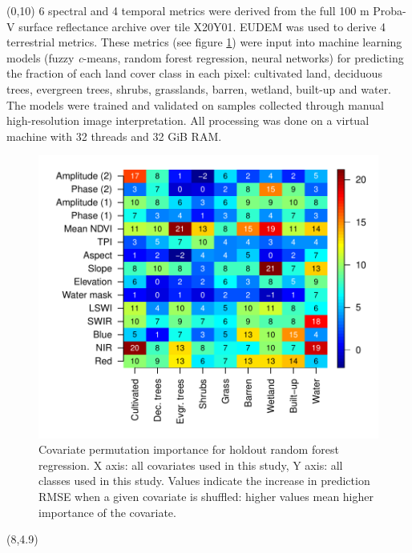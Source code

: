 \documentclass[20pt]{beamer}
\begin{document}
\begin{frame}{}
	\begin{textblock}{7}(0,10)
	  \Line 
	  6 spectral and 4 temporal metrics were derived from the full 100 m Proba-V surface reflectance archive over tile X20Y01. EUDEM was used to derive 4 terrestrial metrics. These metrics (see figure \ref{fig-varimp}) were input into machine learning models (fuzzy \textit{c}-means, random forest regression, neural networks) for predicting the fraction of each land cover class in each pixel: cultivated land, deciduous trees, evergreen trees, shrubs, grasslands, barren, wetland, built-up and water. The models were trained and validated on samples collected through manual high-resolution image interpretation. All processing was done on a virtual machine with 32 threads and 32 GiB RAM.
	  
	  \begin{figure}
			\includegraphics[width=7\TPHorizModule]{../thesis/thesis-figures/variable-importance}
			\caption{Covariate permutation importance for holdout random forest regression. X axis: all covariates used in this study, Y axis: all classes used in this study. Values indicate the increase in prediction RMSE when a given covariate is shuffled: higher values mean higher importance of the covariate.}
			\label{fig-varimp}
      \end{figure}
	
	\end{textblock}
	
	\begin{textblock}{7}(8,4.9)
		\Line
		

\end{textblock}
\end{frame}
\end{document}
